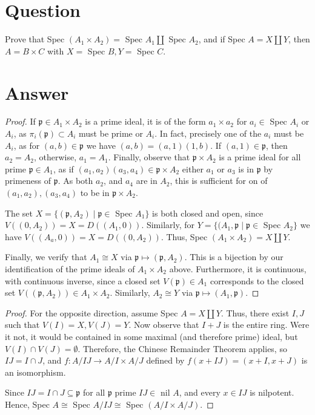 \documentclass[11pt]{article}
\begin{document}
\title{}
\author{Frederick Robinson}
\date{13 May 2011}
\maketitle

\section*{Question}Prove that Spec $(A_1 \times A_2) = $ Spec $A_1 \coprod $ Spec $A_2$, and if Spec $A = X \coprod Y$, then $A = B \times C$ with $X =$ Spec $B, Y=$ Spec $C$.
\section*{Answer}
\begin{proof}
If $\mathfrak{p} \in A_1 \times A_2$ is a prime ideal, it is of the form  $a_1 \times a_2$ for $a_i \in $ Spec $A_i$  or $A_i$, as $\pi_i( \mathfrak{p}) \subset A_i $ must be prime or $A_i$. 
In fact, precisely one of the $a_i$ must be $A_i$, as for $(a,b) \in \mathfrak{p}$ we have $(a,b)=(a,1)(1,b)$. If $(a,1) \in \mathfrak{p}$, then $a_2 = A_2$, otherwise, $a_1 = A_1$. Finally, observe that $\mathfrak{p} \times A_2$ is a prime ideal for all prime $\mathfrak{p } \in A_1$, as if $(a_1, a_2)(a_3,a_4) \in \mathfrak{p} \times A_2$ either $a_1$ or $a_3$ is in $\mathfrak{p}$ by primeness of $\mathfrak{p}$. As both $a_2$, and $a_4$ are in $A_2$, this is sufficient for on of $(a_1,a_2), (a_3,a_4)$ to be in $\mathfrak{p} \times A_2$.


The set $X = \{ (\mathfrak{p} , A_2) \mid \mathfrak{p} \in $ Spec $A_1 \}$ is both closed and open, since $V((0, A_2)) = X = D((A_1 , 0))$. Similarly, for $Y =  \{ ( A_1, \mathfrak{p} \mid \mathfrak{p} \in $ Spec $A_2 \}$ we have $V( (A_a , 0) )= X = D((0 , A_2))$. Thus, Spec $(A_1 \times A_2) = X \coprod Y$. 

Finally, we verify that $A_1 \cong X$ via $\mathfrak{p } \mapsto (\mathfrak{p} , A_2)$. This is a bijection by our identification of the prime ideals of $A_1 \times A_2$ above. Furthermore, it is continuous, with continuous inverse, since a closed set $V(\mathfrak{p}) \in A_1$ corresponds to the closed set $V((\mathfrak{p}, A_2)) \in A_1 \times A_2$. Similarly, $A_2 \cong Y$ via $\mathfrak{p} \mapsto (A_1, \mathfrak{p})$.
\end{proof}

\begin{proof}
For the opposite direction, assume Spec $A = X \coprod Y$. Thus, there exist $I,J$ such that $V(I) = X, V(J) =Y$. Now observe that $I+J$ is the entire ring. Were it not, it would be contained in some maximal (and therefore prime) ideal,  but $V(I) \cap V(J) = \emptyset$. Therefore, the Chinese Remainder Theorem applies, so $IJ = I \cap J$, and $f: A/ IJ  \to A / I \times A/J$ defined by $f(x+ IJ) = (x+ I , x+J)$ is an isomorphism.

Since $IJ  = I \cap J \subseteq \mathfrak{p}$ for all $\mathfrak{p}$ prime $IJ \in $ nil $A$, and every $x \in IJ$ is nilpotent. Hence, Spec $A \cong$ Spec $A/IJ \cong$ Spec $(A/I \times A/J)$.
\end{proof}
\end{document}
